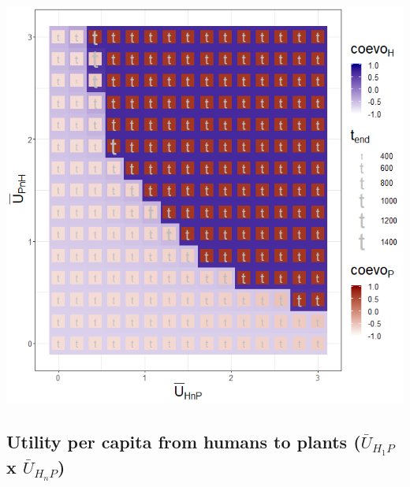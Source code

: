 \documentclass[]{book}
\begin{document}

\includegraphics[width=1\linewidth]{plots/3_twoPar-mU.HnP-mU.PnH_plot}

\newpage

\hypertarget{utility-per-capita-from-humans-to-plants-baru_h_1p-x-baru_h_np}{%
\subsection{\texorpdfstring{Utility per capita from humans to plants (\(\bar{U}_{H_{1}P}\) x \(\bar{U}_{H_{n}P}\))}{Utility per capita from humans to plants (\textbackslash{}bar\{U\}\_\{H\_\{1\}P\} x \textbackslash{}bar\{U\}\_\{H\_\{n\}P\})}}\label{utility-per-capita-from-humans-to-plants-baru_h_1p-x-baru_h_np}}

\end{document}
